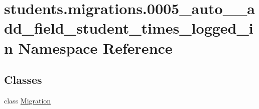 \hypertarget{namespacestudents_1_1migrations_1_10005__auto____add__field__student__times__logged__in}{\section{students.\-migrations.0005\-\_\-auto\-\_\-\-\_\-add\-\_\-field\-\_\-student\-\_\-times\-\_\-logged\-\_\-in Namespace Reference}
\label{namespacestudents_1_1migrations_1_10005__auto____add__field__student__times__logged__in}
}
\subsection*{Classes}
\begin{DoxyCompactItemize}
\item 
class \hyperlink{classstudents_1_1migrations_1_10005__auto____add__field__student__times__logged__in_1_1_migration}{Migration}
\end{DoxyCompactItemize}
